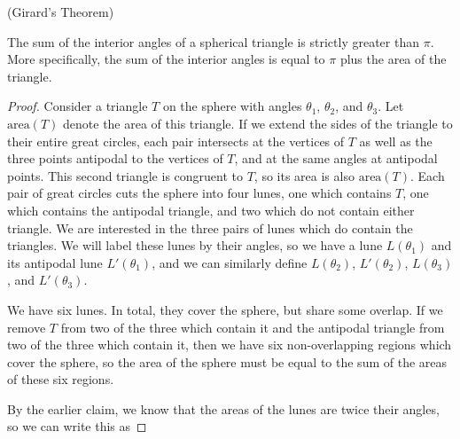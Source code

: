 \begin{lemma}(Girard's Theorem)\label{lem:sphtri}
	
	The sum of the interior angles of a spherical triangle is strictly greater than $\pi$.  More specifically, the sum of the interior angles is equal to $\pi$ plus the area of the triangle.
\end{lemma}

\begin{proof}
	Consider a triangle $T$ on the sphere with angles $\theta_1$, $\theta_2$, and $\theta_3$.  Let $\mathrm{area}(T)$ denote the area of this triangle. If we extend the sides of the triangle to their entire great circles, each pair intersects at the vertices of $T$ as well as the three points antipodal to the vertices of $T$, and at the same angles at antipodal points.  This second triangle is congruent to $T$, so its area is also $\mathrm{area}(T)$.  Each pair of great circles cuts the sphere into four lunes, one which contains $T$, one which contains the antipodal triangle, and two which do not contain either triangle.  We are interested in the three pairs of lunes which do contain the triangles.  We will label these lunes by their angles, so we have a lune $L(\theta_1)$ and its antipodal lune $L'(\theta_1)$, and we can similarly define $L(\theta_2)$, $L'(\theta_2)$, $L(\theta_3)$, and $L'(\theta_3)$.
	
	

	
	
	We have six lunes.  In total, they cover the sphere, but share some overlap.  If we remove $T$ from two of the three which contain it and the antipodal triangle from two of the three which contain it, then we have six non-overlapping regions which cover the sphere, so the area of the sphere must be equal to the sum of the areas of these six regions.  
	
	

	
	By the earlier claim, we know that the areas of the lunes are twice their angles, so we can write this as
	

\end{proof}
